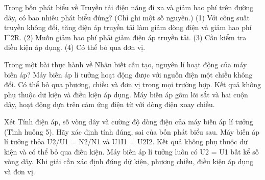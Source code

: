 \begin{ex}
Trong bốn phát biểu về Truyền tải điện năng đi xa và giảm hao phí trên đường dây, có bao nhiêu phát biểu đúng? (Chỉ ghi một số nguyên.) (1) Với công suất truyền không đổi, tăng điện áp truyền tải làm giảm dòng điện và giảm hao phí I^2R. (2) Muốn giảm hao phí phải giảm điện áp truyền tải. (3) Cần kiểm tra điều kiện áp dụng. (4) Có thể bỏ qua đơn vị.
\end{ex}

\begin{ex}
Trong một bài thực hành về Nhận biết cấu tạo, nguyên lí hoạt động của máy biến áp?
\choice
{Máy biến áp lí tưởng hoạt động được với nguồn điện một chiều không đổi.}
{Có thể bỏ qua phương, chiều và đơn vị trong mọi trường hợp.}
{Kết quả không phụ thuộc dữ kiện và điều kiện áp dụng.}
{\True Máy biến áp gồm lõi sắt và hai cuộn dây, hoạt động dựa trên cảm ứng điện từ với dòng điện xoay chiều.}
\end{ex}

\begin{ex}
Xét Tính điện áp, số vòng dây và cường độ dòng điện của máy biến áp lí tưởng (Tình huống 5). Hãy xác định tính đúng, sai của bốn phát biểu sau.
\choiceTF
{\True Máy biến áp lí tưởng thỏa U2/U1 = N2/N1 và U1I1 = U2I2.}
{Kết quả không phụ thuộc dữ kiện và có thể bỏ qua điều kiện.}
{Máy biến áp lí tưởng luôn có U2 = U1 bất kể số vòng dây.}
{\True Khi giải cần xác định đúng dữ kiện, phương chiều, điều kiện áp dụng và đơn vị.}
\end{ex}

